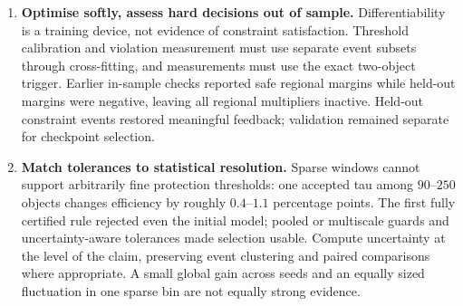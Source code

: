 \begin{enumerate}[label=(\arabic*),itemsep=3pt]
  \item \textbf{Optimise softly, assess hard decisions out of sample.}
  Differentiability is a training device, not evidence of constraint satisfaction. Threshold calibration and violation measurement must use separate event subsets through cross-fitting, and measurements must use the exact two-object trigger. Earlier in-sample checks reported safe regional margins while held-out margins were negative, leaving all regional multipliers inactive. Held-out constraint events restored meaningful feedback; validation remained separate for checkpoint selection.

  \item \textbf{Match tolerances to statistical resolution.}
  Sparse windows cannot support arbitrarily fine protection thresholds: one accepted tau among $90$--$250$ objects changes efficiency by roughly $0.4$--$1.1$ percentage points. The first fully certified rule rejected even the initial model; pooled or multiscale guards and uncertainty-aware tolerances made selection usable. Compute uncertainty at the level of the claim, preserving event clustering and paired comparisons where appropriate. A small global gain across seeds and an equally sized fluctuation in one sparse bin are not equally strong evidence.
\end{enumerate}

